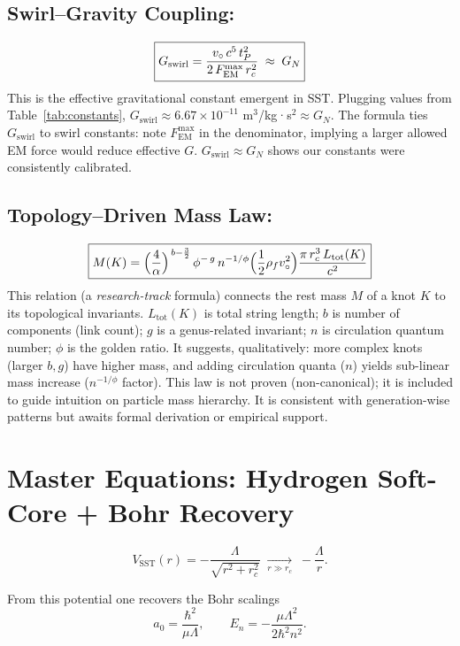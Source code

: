 \documentclass[reprint,aps,onecolumn,nofootinbib]{revtex4-2}
\newcommand{\rc}{r_c}                                    %
\newcommand{\FmaxEM}{F_{\mathrm{EM}}^{\max}}             %
\providecommand{\rc}{r_c}
\begin{document}
        \subsection{Swirl–Gravity Coupling:}
            \[
                \boxed{%
                    G_{\text{swirl}} = \frac{v_{\circ}\,c^5\,t_P^2}{2\,\FmaxEM\,r_c^2}
                    \;\approx\; G_N
                }
            \]
            This is the effective gravitational constant emergent in SST. Plugging values from Table~\ref{tab:constants}, $G_{\text{swirl}}\approx 6.67\times10^{-11}$ m$^3$/kg·s$^2 \approx G_N$. The formula ties $G_{\text{swirl}}$ to swirl constants: note $\FmaxEM$ in the denominator, implying a larger allowed EM force would reduce effective $G$. $G_{\text{swirl}}\approx G_N$ shows our constants were consistently calibrated.

        \subsection{Topology–Driven Mass Law:}
            \[
                \boxed{%
                    M (K) = \Big(\frac{4}{\alpha}\Big)^{\,b-\frac{3}{2}}\,\phi^{-\,g}\,n^{-1/\phi}
                    \Big(\frac{1}{2}\rho_f v_{\circ}^2\Big)
                    \frac{\pi\,r_c^3\,L_{\text{tot}}(K)}{c^2}
                }
            \]
            This relation (a \emph{research-track} formula) connects the rest mass $M$ of a knot $K$ to its topological invariants. $L_{\text{tot}}(K)$ is total string length; $b$ is number of components (link count); $g$ is a genus-related invariant; $n$ is circulation quantum number; $\phi$ is the golden ratio. It suggests, qualitatively: more complex knots (larger $b,g$) have higher mass, and adding circulation quanta ($n$) yields sub-linear mass increase ($n^{-1/\phi}$ factor). This law is not proven (non-canonical); it is included to guide intuition on particle mass hierarchy. It is consistent with generation-wise patterns but awaits formal derivation or empirical support.

    \section{Master Equations: Hydrogen Soft-Core + Bohr Recovery}\label{canon58:hydrogen}
    \begin{tcolorbox}[title=Hydrogen Soft-Core Potential]
    \label{canon58:softcore}
    \[
        V_{\text{SST}}(r)=-\frac{\Lambda}{\sqrt{r^2+\rc^2}}
        \;\xrightarrow[r\gg \rc]{}\; -\frac{\Lambda}{r}.
    \]
    \end{tcolorbox}
    From this potential one recovers the Bohr scalings
    \[
        a_0=\frac{\hbar^2}{\mu\Lambda}, \qquad E_n=-\frac{\mu\Lambda^2}{2\hbar^2 n^2}.
    \]
\end{document}
